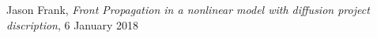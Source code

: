 \documentclass[11pt]{article}
\begin{document}



\newpage				%
\thispagestyle{empty}	%



\newpage				%
\renewcommand{\contentsname}{Table of Contents}
\tableofcontents		%
\thispagestyle{empty}	%


\newpage				%




\newpage				%

	

\newpage				%

\begin{thebibliography}{10}

		Jason Frank,
		\textit{Front Propagation in a nonlinear model with diffusion project discription},
		6 January 2018
		
\end{thebibliography}
\end{document}
